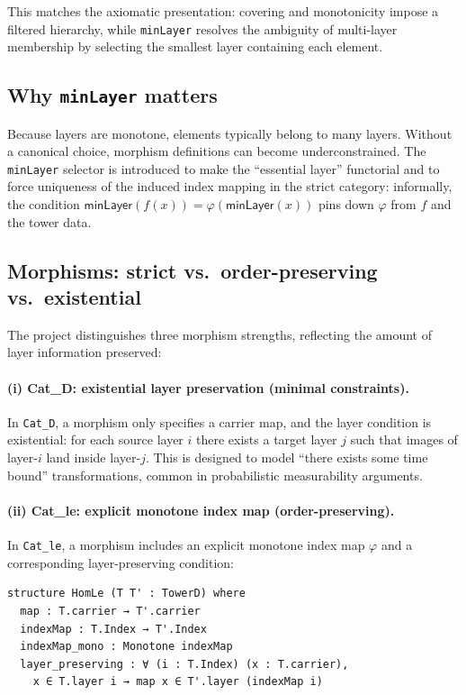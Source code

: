 \documentclass[11pt]{article}
\newcommand{\minLayer}{\mathsf{minLayer}}
\begin{document}
This matches the axiomatic presentation: covering and monotonicity impose a filtered hierarchy, while \texttt{minLayer} resolves the ambiguity of multi-layer membership by selecting the smallest layer containing each element.

\subsection{Why \texttt{minLayer} matters}
Because layers are monotone, elements typically belong to many layers. Without a canonical choice, morphism definitions can become underconstrained. The \texttt{minLayer} selector is introduced to make the ``essential layer'' functorial and to force uniqueness of the induced index mapping in the strict category: informally, the condition $\minLayer(f(x)) = \varphi(\minLayer(x))$ pins down $\varphi$ from $f$ and the tower data.

\subsection{Morphisms: strict vs.\ order-preserving vs.\ existential}
The project distinguishes three morphism strengths, reflecting the amount of layer information preserved:

\paragraph{(i) Cat\_D: existential layer preservation (minimal constraints).}
In \texttt{Cat\_D}, a morphism only specifies a carrier map, and the layer condition is existential: for each source layer $i$ there exists a target layer $j$ such that images of layer-$i$ land inside layer-$j$. This is designed to model ``there exists some time bound'' transformations, common in probabilistic measurability arguments.

\paragraph{(ii) Cat\_le: explicit monotone index map (order-preserving).}
In \texttt{Cat\_le}, a morphism includes an explicit monotone index map $\varphi$ and a corresponding layer-preserving condition:
\begin{lstlisting}
structure HomLe (T T' : TowerD) where
  map : T.carrier → T'.carrier
  indexMap : T.Index → T'.Index
  indexMap_mono : Monotone indexMap
  layer_preserving : ∀ (i : T.Index) (x : T.carrier),
    x ∈ T.layer i → map x ∈ T'.layer (indexMap i)
\end{lstlisting}
\end{document}
